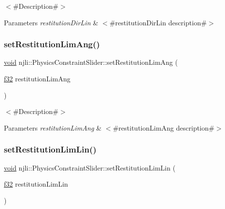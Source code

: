 $<$\#\+Description\#$>$


\begin{DoxyParams}{Parameters}
{\em restitution\+Dir\+Lin} & $<$\#restitution\+Dir\+Lin description\#$>$ \\
\hline
\end{DoxyParams}
\mbox{\label{classnjli_1_1_physics_constraint_slider_a72b12ab4f85f816949b59ba75385abf7}} 
\subsubsection{\texorpdfstring{set\+Restitution\+Lim\+Ang()}{setRestitutionLimAng()}}
{\footnotesize\ttfamily \mbox{\hyperlink{_thread_8h_af1e856da2e658414cb2456cb6f7ebc66}{void}} njli\+::\+Physics\+Constraint\+Slider\+::set\+Restitution\+Lim\+Ang (\begin{DoxyParamCaption}\item[{\mbox{\hyperlink{_util_8h_a5f6906312a689f27d70e9d086649d3fd}{f32}}}]{restitution\+Lim\+Ang }\end{DoxyParamCaption})}

$<$\#\+Description\#$>$


\begin{DoxyParams}{Parameters}
{\em restitution\+Lim\+Ang} & $<$\#restitution\+Lim\+Ang description\#$>$ \\
\hline
\end{DoxyParams}
\mbox{\label{classnjli_1_1_physics_constraint_slider_a70acf1aa88472c443e002d4153f39fc8}} 
\subsubsection{\texorpdfstring{set\+Restitution\+Lim\+Lin()}{setRestitutionLimLin()}}
{\footnotesize\ttfamily \mbox{\hyperlink{_thread_8h_af1e856da2e658414cb2456cb6f7ebc66}{void}} njli\+::\+Physics\+Constraint\+Slider\+::set\+Restitution\+Lim\+Lin (\begin{DoxyParamCaption}\item[{\mbox{\hyperlink{_util_8h_a5f6906312a689f27d70e9d086649d3fd}{f32}}}]{restitution\+Lim\+Lin }\end{DoxyParamCaption})}

